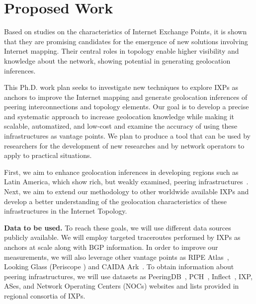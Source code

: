 \chapter{Proposed Work}\label{cap:proposal}
\thispagestyle{empty}


	Based on studies on the characteristics of Internet Exchange Points, it is shown that they are promising candidates for the emergence of new solutions involving Internet mapping. Their central roles in topology enable higher visibility and knowledge about the network, showing potential in generating geolocation inferences.

	This Ph.D. work plan seeks to investigate new techniques to explore IXPs as anchors to improve the Internet mapping and generate geolocation inferences of peering interconnections and topology elements. Our goal is to develop a precise and systematic approach to increase geolocation knowledge while making it scalable, automatized, and low-cost and examine the accuracy of using these infrastructures as vantage points. We plan to produce a tool that can be used by researchers for the development of new researches and by network operators to apply to practical situations.

	First, we aim to enhance geolocation inferences in developing regions such as Latin America, which show rich, but weakly examined, peering infrastructures~\cite{IXbr, DissectingBrazilianIXP}. Next, we aim to extend our methodology to other worldwide available IXPs and develop a better understanding of the geolocation characteristics of these infrastructures in the Internet Topology.


	\textbf{Data to be used.} To reach these goals, we will use different data sources publicly available. We will employ targeted traceroutes performed by IXPs as anchors at scale along with BGP information. In order to improve our measurements, we will also leverage other vantage points as RIPE Atlas~\cite{ripeatlas}, Looking Glass (Periscope \cite{Periscope}) and CAIDA Ark~\cite{ark}. To obtain information about peering infrastructures, we will use datasets as PeeringDB~\cite{peeringDB}, PCH~\cite{pch}, Inflect~\cite{inflect}, IXP, ASes, and Network Operating Centers (NOCs) websites and lists provided in regional consortia of IXPs.

